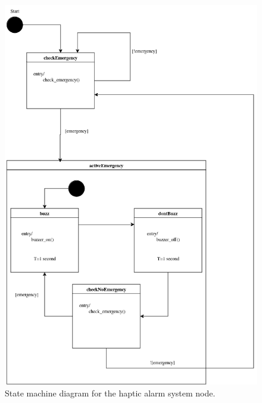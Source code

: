\begin{figure}[H]
    \centering
    \includegraphics[width=\linewidth]{../assets/HapticAlarmStateMachine.png}
    \caption{State machine diagram for the haptic alarm system node.}
\end{figure}
